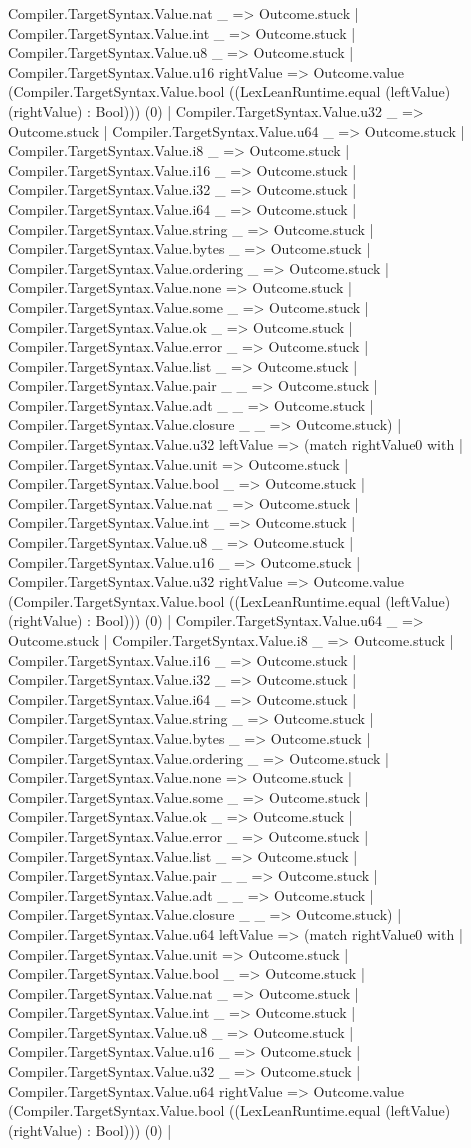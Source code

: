 \documentclass[11pt]{article}
\begin{document}
Compiler.TargetSyntax.Value.nat \_ => Outcome.stuck | Compiler.TargetSyntax.Value.int \_ => Outcome.stuck | Compiler.TargetSyntax.Value.u8 \_ => Outcome.stuck | Compiler.TargetSyntax.Value.u16 rightValue => Outcome.value (Compiler.TargetSyntax.Value.bool ((LexLeanRuntime.equal (leftValue) (rightValue) : Bool))) (0) | Compiler.TargetSyntax.Value.u32 \_ => Outcome.stuck | Compiler.TargetSyntax.Value.u64 \_ => Outcome.stuck | Compiler.TargetSyntax.Value.i8 \_ => Outcome.stuck | Compiler.TargetSyntax.Value.i16 \_ => Outcome.stuck | Compiler.TargetSyntax.Value.i32 \_ => Outcome.stuck | Compiler.TargetSyntax.Value.i64 \_ => Outcome.stuck | Compiler.TargetSyntax.Value.string \_ => Outcome.stuck | Compiler.TargetSyntax.Value.bytes \_ => Outcome.stuck | Compiler.TargetSyntax.Value.ordering \_ => Outcome.stuck | Compiler.TargetSyntax.Value.none => Outcome.stuck | Compiler.TargetSyntax.Value.some \_ => Outcome.stuck | Compiler.TargetSyntax.Value.ok \_ => Outcome.stuck | Compiler.TargetSyntax.Value.error \_ => Outcome.stuck | Compiler.TargetSyntax.Value.list \_ => Outcome.stuck | Compiler.TargetSyntax.Value.pair \_ \_ => Outcome.stuck | Compiler.TargetSyntax.Value.adt \_ \_ => Outcome.stuck | Compiler.TargetSyntax.Value.closure \_ \_ => Outcome.stuck) | Compiler.TargetSyntax.Value.u32 leftValue => (match rightValue0 with | Compiler.TargetSyntax.Value.unit => Outcome.stuck | Compiler.TargetSyntax.Value.bool \_ => Outcome.stuck | Compiler.TargetSyntax.Value.nat \_ => Outcome.stuck | Compiler.TargetSyntax.Value.int \_ => Outcome.stuck | Compiler.TargetSyntax.Value.u8 \_ => Outcome.stuck | Compiler.TargetSyntax.Value.u16 \_ => Outcome.stuck | Compiler.TargetSyntax.Value.u32 rightValue => Outcome.value (Compiler.TargetSyntax.Value.bool ((LexLeanRuntime.equal (leftValue) (rightValue) : Bool))) (0) | Compiler.TargetSyntax.Value.u64 \_ => Outcome.stuck | Compiler.TargetSyntax.Value.i8 \_ => Outcome.stuck | Compiler.TargetSyntax.Value.i16 \_ => Outcome.stuck | Compiler.TargetSyntax.Value.i32 \_ => Outcome.stuck | Compiler.TargetSyntax.Value.i64 \_ => Outcome.stuck | Compiler.TargetSyntax.Value.string \_ => Outcome.stuck | Compiler.TargetSyntax.Value.bytes \_ => Outcome.stuck | Compiler.TargetSyntax.Value.ordering \_ => Outcome.stuck | Compiler.TargetSyntax.Value.none => Outcome.stuck | Compiler.TargetSyntax.Value.some \_ => Outcome.stuck | Compiler.TargetSyntax.Value.ok \_ => Outcome.stuck | Compiler.TargetSyntax.Value.error \_ => Outcome.stuck | Compiler.TargetSyntax.Value.list \_ => Outcome.stuck | Compiler.TargetSyntax.Value.pair \_ \_ => Outcome.stuck | Compiler.TargetSyntax.Value.adt \_ \_ => Outcome.stuck | Compiler.TargetSyntax.Value.closure \_ \_ => Outcome.stuck) | Compiler.TargetSyntax.Value.u64 leftValue => (match rightValue0 with | Compiler.TargetSyntax.Value.unit => Outcome.stuck | Compiler.TargetSyntax.Value.bool \_ => Outcome.stuck | Compiler.TargetSyntax.Value.nat \_ => Outcome.stuck | Compiler.TargetSyntax.Value.int \_ => Outcome.stuck | Compiler.TargetSyntax.Value.u8 \_ => Outcome.stuck | Compiler.TargetSyntax.Value.u16 \_ => Outcome.stuck | Compiler.TargetSyntax.Value.u32 \_ => Outcome.stuck | Compiler.TargetSyntax.Value.u64 rightValue => Outcome.value (Compiler.TargetSyntax.Value.bool ((LexLeanRuntime.equal (leftValue) (rightValue) : Bool))) (0) | 
\end{document}
